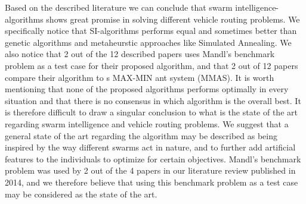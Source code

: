 



Based on the described literature we can conclude that swarm intelligence-algorithms shows great promise in solving different vehicle routing problems. We specifically notice that SI-algorithms performs equal and sometimes better than genetic algorithms and  metaheurstic approaches like Simulated Annealing. We also notice that 2 out of the 12 described papers uses Mandl's benchmark problem as a test case for their proposed algorithm, and that 2 out of 12 papers compare their algorithm to \citet{stutzle99}s MAX-MIN ant system (MMAS). It is worth mentioning that none of the proposed algorithms performs optimally in every situation and that there is no consensus in which algorithm is the overall best. It is therefore difficult to draw a singular conclusion to what is the state of the art regarding swarm intelligence and vehicle routing problems. We suggest that a general state of the art regarding the algorithm may be described as being inspired by the way different swarms act in nature, and to further add artificial features to the individuals to optimize for certain objectives. Mandl's benchmark problem was used by 2 out of the 4 papers in our literature review published in 2014, and we therefore believe that using this benchmark problem as a test case may be considered as the state of the art.




